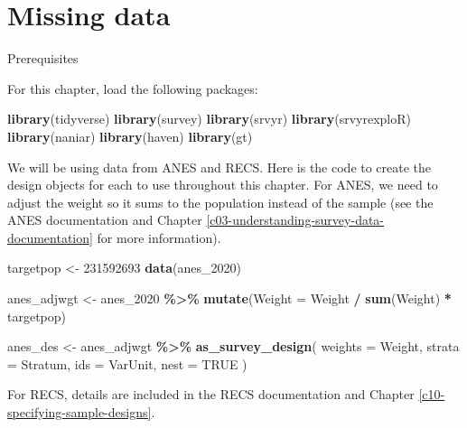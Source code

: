 \documentclass[
]{krantz}
\makeatletter
\newenvironment{Shaded}{\begin{snugshade}}{\end{snugshade}}
\newcommand{\AttributeTok}[1]{\textcolor[rgb]{0.27,0.27,0.27}{#1}}
\newcommand{\ConstantTok}[1]{\textcolor[rgb]{0.37,0.37,0.37}{#1}}
\newcommand{\DecValTok}[1]{\textcolor[rgb]{0.06,0.06,0.06}{#1}}
\newcommand{\FunctionTok}[1]{\textcolor[rgb]{0.27,0.27,0.27}{\textbf{#1}}}
\newcommand{\NormalTok}[1]{#1}
\newcommand{\OtherTok}[1]{\textcolor[rgb]{0.37,0.37,0.37}{#1}}
\newcommand{\SpecialCharTok}[1]{\textcolor[rgb]{0.43,0.43,0.43}{\textbf{#1}}}
\newenvironment{kframe}{%
\medskip{}
\setlength{\fboxsep}{.8em}
 \def\at@end@of@kframe{}%
 \ifinner\ifhmode%
  \def\at@end@of@kframe{\end{minipage}}%
  \begin{minipage}{\columnwidth}%
 \fi\fi%
 \def\FrameCommand##1{\hskip\@totalleftmargin \hskip-\fboxsep
 \colorbox{shadecolor}{##1}\hskip-\fboxsep
     \hskip-\linewidth \hskip-\@totalleftmargin \hskip\columnwidth}%
 \MakeFramed {\advance\hsize-\width
   \@totalleftmargin\z@ \linewidth\hsize
   \@setminipage}}%
 {\par\unskip\endMakeFramed%
 \at@end@of@kframe}
\renewenvironment{Shaded}{\begin{kframe}}{\end{kframe}}
\makeatother
\begin{document}
\hypertarget{c11-missing-data}{%
\chapter{Missing data}\label{c11-missing-data}}

\begin{prereqbox}{Prerequisites}

For this chapter, load the following packages:

\begin{Shaded}
\begin{Highlighting}[]
\FunctionTok{library}\NormalTok{(tidyverse)}
\FunctionTok{library}\NormalTok{(survey)}
\FunctionTok{library}\NormalTok{(srvyr)}
\FunctionTok{library}\NormalTok{(srvyrexploR)}
\FunctionTok{library}\NormalTok{(naniar)}
\FunctionTok{library}\NormalTok{(haven)}
\FunctionTok{library}\NormalTok{(gt)}
\end{Highlighting}
\end{Shaded}

We will be using data from ANES and RECS. Here is the code to create the design objects for each to use throughout this chapter. For ANES, we need to adjust the weight so it sums to the population instead of the sample (see the ANES documentation and Chapter \ref{c03-understanding-survey-data-documentation} for more information).

\begin{Shaded}
\begin{Highlighting}[]
\NormalTok{targetpop }\OtherTok{\textless{}{-}} \DecValTok{231592693}
\FunctionTok{data}\NormalTok{(anes\_2020)}

\NormalTok{anes\_adjwgt }\OtherTok{\textless{}{-}}\NormalTok{ anes\_2020 }\SpecialCharTok{\%\textgreater{}\%}
  \FunctionTok{mutate}\NormalTok{(}\AttributeTok{Weight =}\NormalTok{ Weight }\SpecialCharTok{/} \FunctionTok{sum}\NormalTok{(Weight) }\SpecialCharTok{*}\NormalTok{ targetpop)}

\NormalTok{anes\_des }\OtherTok{\textless{}{-}}\NormalTok{ anes\_adjwgt }\SpecialCharTok{\%\textgreater{}\%}
  \FunctionTok{as\_survey\_design}\NormalTok{(}
    \AttributeTok{weights =}\NormalTok{ Weight,}
    \AttributeTok{strata =}\NormalTok{ Stratum,}
    \AttributeTok{ids =}\NormalTok{ VarUnit,}
    \AttributeTok{nest =} \ConstantTok{TRUE}
\NormalTok{  )}
\end{Highlighting}
\end{Shaded}

For RECS, details are included in the RECS documentation and Chapter \ref{c10-specifying-sample-designs}.


\end{prereqbox}
\end{document}
